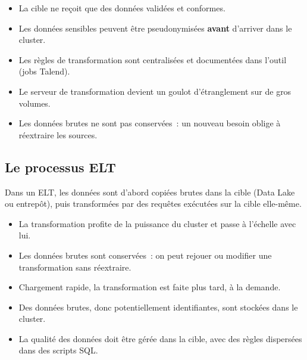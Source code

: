 \begin{itemize}
	\item[+] La cible ne reçoit que des données validées et conformes.
	\item[+] Les données sensibles peuvent être pseudonymisées \textbf{avant} d'arriver dans le cluster.
	\item[+] Les règles de transformation sont centralisées et documentées dans l'outil (jobs Talend).
	\item[--] Le serveur de transformation devient un goulot d'étranglement sur de gros volumes.
	\item[--] Les données brutes ne sont pas conservées~: un nouveau besoin oblige à réextraire les sources.
\end{itemize}

\subsection{Le processus ELT}

\noindent Dans un ELT, les données sont d'abord copiées brutes dans la cible (Data Lake ou entrepôt), puis transformées par des requêtes exécutées sur la cible elle-même.

\begin{center}
\end{center}

\begin{itemize}
	\item[+] La transformation profite de la puissance du cluster et passe à l'échelle avec lui.
	\item[+] Les données brutes sont conservées~: on peut rejouer ou modifier une transformation sans réextraire.
	\item[+] Chargement rapide, la transformation est faite plus tard, à la demande.
	\item[--] Des données brutes, donc potentiellement identifiantes, sont stockées dans le cluster.
	\item[--] La qualité des données doit être gérée dans la cible, avec des règles dispersées dans des scripts SQL.
\end{itemize}

